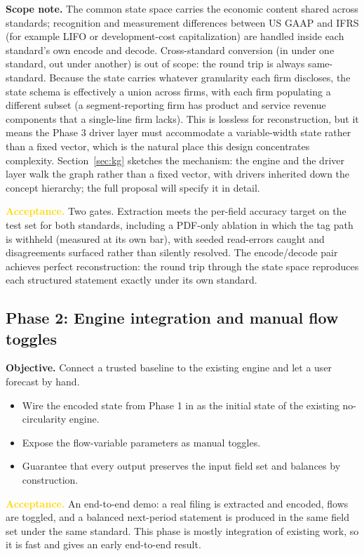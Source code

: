 \documentclass[11pt]{article}
\newcommand{\lead}[2]{\par\addvspace{5pt}\textbf{\textcolor{#1}{#2}}}
\begin{document}
\lead{navytwo}{Scope note.} The common state space carries the economic content shared across standards; recognition and measurement differences between US GAAP and IFRS (for example LIFO or development-cost capitalization) are handled inside each standard's own encode and decode. Cross-standard conversion (in under one standard, out under another) is out of scope: the round trip is always same-standard. Because the state carries whatever granularity each firm discloses, the state schema is effectively a union across firms, with each firm populating a different subset (a segment-reporting firm has product and service revenue components that a single-line firm lacks). This is lossless for reconstruction, but it means the Phase 3 driver layer must accommodate a variable-width state rather than a fixed vector, which is the natural place this design concentrates complexity. Section~\ref{sec:kg} sketches the mechanism: the engine and the driver layer walk the graph rather than a fixed vector, with drivers inherited down the concept hierarchy; the full proposal will specify it in detail.

\lead{gold}{Acceptance.} Two gates. Extraction meets the per-field accuracy target on the test set for both standards, including a PDF-only ablation in which the tag path is withheld (measured at its own bar), with seeded read-errors caught and disagreements surfaced rather than silently resolved. The encode/decode pair achieves perfect reconstruction: the round trip through the state space reproduces each structured statement exactly under its own standard.

\subsection{Phase 2: Engine integration and manual flow toggles}
\lead{navytwo}{Objective.} Connect a trusted baseline to the existing engine and let a user forecast by hand.
\begin{itemize}
  \item Wire the encoded state from Phase 1 in as the initial state of the existing no-circularity engine.
  \item Expose the flow-variable parameters as manual toggles.
  \item Guarantee that every output preserves the input field set and balances by construction.
\end{itemize}
\lead{gold}{Acceptance.} An end-to-end demo: a real filing is extracted and encoded, flows are toggled, and a balanced next-period statement is produced in the same field set under the same standard. This phase is mostly integration of existing work, so it is fast and gives an early end-to-end result.
\end{document}
